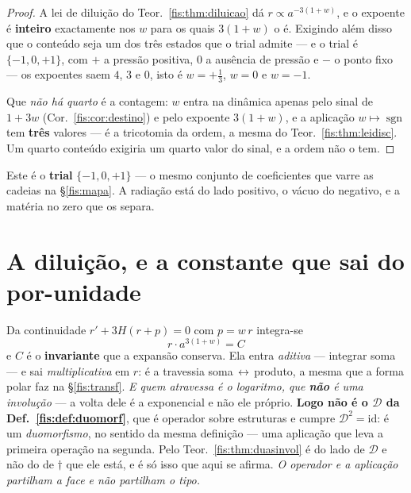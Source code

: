 \documentclass[livro.tex]{subfiles}
\begin{document}
\begin{proof}
A lei de diluição do Teor.~\ref{fis:thm:diluicao} dá $r\propto a^{-3(1+w)}$, e o
expoente é \textbf{inteiro} exactamente nos $w$ para os quais $3(1+w)$ o é.
Exigindo além disso que o conteúdo seja um dos três estados que o trial admite
--- e o trial é $\{-1,0,+1\}$, com $+$ a pressão positiva, $0$ a ausência de
pressão e $-$ o ponto fixo --- os expoentes saem $4$, $3$ e $0$, isto é
$w=+\tfrac13$, $w=0$ e $w=-1$.

Que \emph{não há quarto} é a contagem: $w$ entra na dinâmica apenas pelo sinal de
$1+3w$ (Cor.~\ref{fis:cor:destino}) e pelo expoente $3(1+w)$, e a aplicação
$w\mapsto\operatorname{sgn}$ tem \textbf{três} valores --- é a tricotomia da
ordem, a mesma do Teor.~\ref{fis:thm:leidisc}. Um quarto conteúdo exigiria um
quarto valor do sinal, e a ordem não o tem.
\end{proof}

\medskip\noindent Este é o \textbf{trial} $\{-1,0,+1\}$ --- o mesmo conjunto de
coeficientes que varre as cadeias na §\ref{fis:mapa}. A radiação está do lado
positivo, o vácuo do negativo, e a matéria no zero que os separa.


\section{A diluição, e a constante que sai do por-unidade}\label{fis:diluicao}

\begin{teorema}\label{fis:thm:diluicao}
Da continuidade $r'+3H(r+p)=0$ com $p=w\,r$ integra-se
\[
\boxed{\;r\cdot a^{3(1+w)}=C\;}
\]
e $C$ é o \textbf{invariante} que a expansão conserva. Ela entra
\emph{aditiva} --- integrar soma --- e sai \emph{multiplicativa} em $r$: é a
travessia soma\,$\leftrightarrow$\,produto, a mesma que a forma polar faz na
§\ref{fis:transf}. \emph{E quem atravessa é o logaritmo, que \textbf{não} é uma
involução} --- a volta dele é a exponencial e não ele próprio. \textbf{Logo não é
o $\mathcal{D}$ da Def.~\ref{fis:def:duomorf}}, que é operador sobre estruturas e
cumpre $\mathcal{D}^{2}=\mathrm{id}$: é um \emph{duomorfismo}, no sentido da
mesma definição --- uma aplicação que leva a primeira operação na segunda. Pelo
Teor.~\ref{fis:thm:duasinvol} é do lado de $\mathcal{D}$ e não do de $\dagger$
que ele está, e é só isso que aqui se afirma. \emph{O operador e a aplicação
partilham a face e não partilham o tipo.}
\end{teorema}
\end{document}
